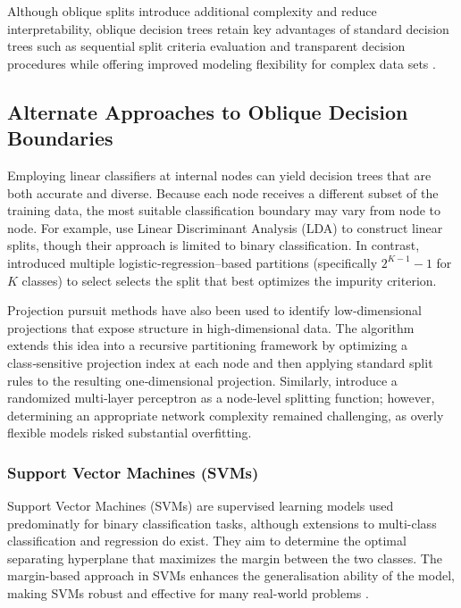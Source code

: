 Although oblique splits introduce additional complexity and reduce interpretability, oblique decision trees retain key advantages of standard decision trees such as sequential split criteria evaluation and transparent decision procedures while offering improved modeling flexibility for complex data sets \citep{kozial2009, friedl1997, huan1998}.

\subsection{Alternate Approaches to Oblique Decision Boundaries}\label{alternate-approaches-to-oblique-decision-boundaries}

Employing linear classifiers at internal nodes can yield decision trees that are both accurate and diverse. Because each node receives a different subset of the training data, the most suitable classification boundary may vary from node to node. For example, \citep{menze2011, lemmond2010} use Linear Discriminant Analysis (LDA) to construct linear splits, though their approach is limited to binary classification. In contrast, \citet{Truong2009} introduced multiple logistic‑regression--based partitions (specifically \(2^{K-1} - 1\) for \(K\) classes) to select selects the split that best optimizes the impurity criterion.

Projection pursuit methods \citep{friedman2006, kruskal1969} have also been used to identify low‑dimensional projections that expose structure in high‑dimensional data. The \citep{pptree2013, Silva2021} algorithm extends this idea into a recursive partitioning framework by optimizing a class‑sensitive projection index at each node and then applying standard split rules to the resulting one‑dimensional projection. Similarly, \citet{Bulo2014} introduce a randomized multi‑layer perceptron as a node‑level splitting function; however, determining an appropriate network complexity remained challenging, as overly flexible models risked substantial overfitting.

\subsubsection{Support Vector Machines (SVMs)}\label{support-vector-machines-svms}

Support Vector Machines (SVMs) are supervised learning models used predominatly for binary classification tasks, although extensions to multi-class classification and regression do exist. They aim to determine the optimal separating hyperplane that maximizes the margin between the two classes. The margin-based approach in SVMs enhances the generalisation ability of the model, making SVMs robust and effective for many real-world problems \citep{cristianini2000}.

